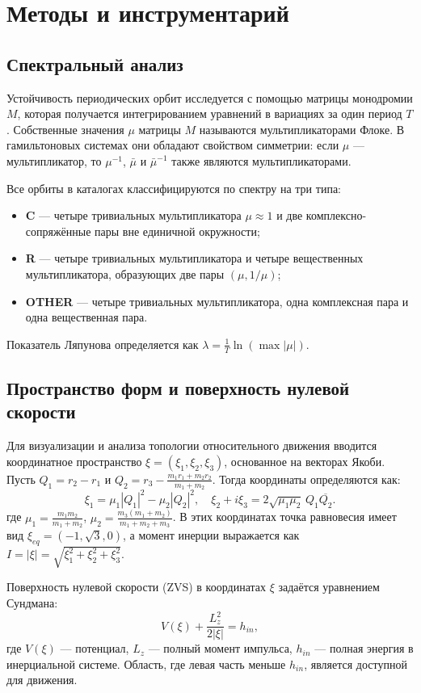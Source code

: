 \section{Методы и инструментарий}

\subsection{Спектральный анализ}
Устойчивость периодических орбит исследуется с помощью матрицы монодромии \(M\), которая получается интегрированием уравнений в вариациях за один период \(T\). Собственные значения \(\mu\) матрицы \(M\) называются мультипликаторами Флоке. В гамильтоновых системах они обладают свойством симметрии: если \(\mu\) — мультипликатор, то \(\mu^{-1}\), \(\bar{\mu}\) и \(\bar{\mu}^{-1}\) также являются мультипликаторами.

Все орбиты в каталогах классифицируются по спектру на три типа:
\begin{itemize}
    \item \textbf{C} — четыре тривиальных мультипликатора \(\mu \approx 1\) и две комплексно-сопряжённые пары вне единичной окружности;
    \item \textbf{R} — четыре тривиальных мультипликатора и четыре вещественных мультипликатора, образующих две пары \((\mu, 1/\mu)\);
    \item \textbf{OTHER} — четыре тривиальных мультипликатора, одна комплексная пара и одна вещественная пара.
\end{itemize}
Показатель Ляпунова определяется как \(\lambda = \frac{1}{T} \ln(\max |\mu|)\).

\subsection{Пространство форм и поверхность нулевой скорости}
Для визуализации и анализа топологии относительного движения вводится координатное пространство \(\xi = (\xi_1, \xi_2, \xi_3)\), основанное на векторах Якоби. Пусть \(Q_1 = r_2 - r_1\) и \(Q_2 = r_3 - \frac{m_1 r_1 + m_2 r_2}{m_1 + m_2}\). Тогда координаты определяются как:
\begin{equation}
    \xi_1 = \mu_1 |Q_1|^2 - \mu_2 |Q_2|^2, \quad
    \xi_2 + i\xi_3 = 2\sqrt{\mu_1 \mu_2} \, Q_1 \overline{Q_2}.
\end{equation}
где \(\mu_1 = \frac{m_1 m_2}{m_1+m_2}\), \(\mu_2 = \frac{m_3(m_1+m_2)}{m_1+m_2+m_3}\). В этих координатах точка равновесия имеет вид \(\xi_{eq} = (-1, \sqrt{3}, 0)\), а момент инерции выражается как \(I = |\xi| = \sqrt{\xi_1^2 + \xi_2^2 + \xi_3^2}\).

Поверхность нулевой скорости (ZVS) в координатах \(\xi\) задаётся уравнением Сундмана:
\begin{equation}
    V(\xi) + \frac{L_z^2}{2|\xi|} = h_{in},
\end{equation}
где \(V(\xi)\) — потенциал, \(L_z\) — полный момент импульса, \(h_{in}\) — полная энергия в инерциальной системе. Область, где левая часть меньше \(h_{in}\), является доступной для движения.
